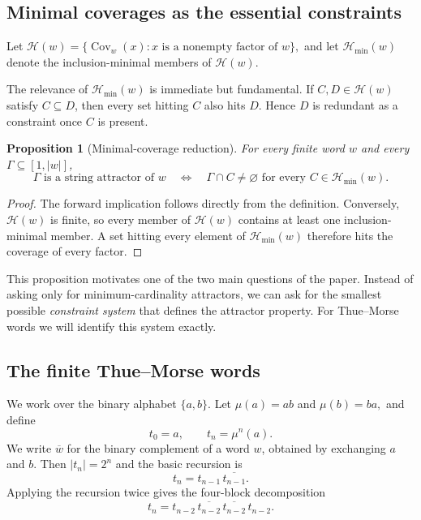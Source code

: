 \documentclass[10pt,a4paper]{article}
\newtheorem{proposition}[theorem]{Proposition}
\theoremstyle{definition}\newtheorem{definition}[theorem]{Definition}
\theoremstyle{remark}\newtheorem{remark}[theorem]{Remark}
\newcommand{\Cov}{\operatorname{Cov}}
\newcommand{\Hmin}{\mathcal{H}_{\min}}
\begin{document}
\subsection{Minimal coverages as the essential constraints}
Let
$
\mathcal H(w)=\{\Cov_w(x):x\text{ is a nonempty factor of }w\},
$
and let $\Hmin(w)$ denote the inclusion-minimal members of $\mathcal H(w)$.

The relevance of $\Hmin(w)$ is immediate but fundamental. If $C,D\in\mathcal H(w)$ satisfy $C\subseteq D$, then every set hitting $C$ also hits $D$. Hence $D$ is redundant as a constraint once $C$ is present.

\begin{proposition}[Minimal-coverage reduction]
\label{prop:minimal-coverage-reduction}
For every finite word $w$ and every $\Gamma\subseteq[1,|w|]$,
\[
\Gamma\text{ is a string attractor of }w
\quad\Longleftrightarrow\quad
\Gamma\cap C\neq\varnothing
\text{ for every }C\in\Hmin(w).
\]
\end{proposition}

\begin{proof}
The forward implication follows directly from the definition. Conversely, $\mathcal H(w)$ is finite, so every member of $\mathcal H(w)$ contains at least one inclusion-minimal member. A set hitting every element of $\Hmin(w)$ therefore hits the coverage of every factor.
\end{proof}

This proposition motivates one of the two main questions of the paper. Instead of asking only for minimum-cardinality attractors, we can ask for the smallest possible \emph{constraint system} that defines the attractor property. For Thue--Morse words we will identify this system exactly.

\subsection{The finite Thue--Morse words}
We work over the binary alphabet $\{a,b\}$. Let
$
\mu(a)=ab$ and
$
\mu(b)=ba,
$
and define
\[
t_0=a,\qquad t_n=\mu^n(a).
\]
We write $\overline{w}$ for the binary complement of a word $w$, obtained by exchanging $a$ and $b$. Then
$
|t_n|=2^n
$
and the basic recursion is
\begin{equation}
t_n=t_{n-1}\,\overline{t_{n-1}}.
\label{eq:tm-recursion}
\end{equation}
Applying the recursion twice gives the four-block decomposition
\begin{equation}
t_n=t_{n-2}\,\overline{t_{n-2}}\,\overline{t_{n-2}}\,t_{n-2}.
\label{eq:tm-four-block}
\end{equation}
\end{document}
